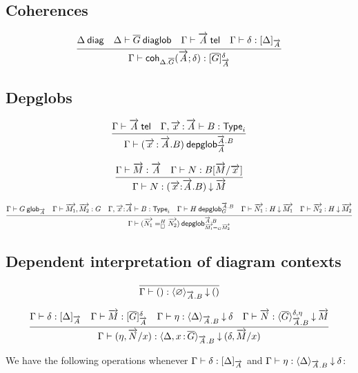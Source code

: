 \subsection{Coherences}

\begin{small}
  \[
  \infer{\ofglob{\Gamma}{\coh{{\Delta}.\diag{G}}{\tel A}{\delta}}
    {\interpglob{\diag{G}}{\tel A}{\delta}}}
  {\wfdiag{\Delta}
    & \wfdiaglob{\Delta}{\diag G}
    & \wftel{\Gamma}{\tel A}
    & \ofinterp{\Gamma}{\delta}{\Delta}{\tel A}}
  \]
\end{small}

\subsection{Depglobs}

\begin{small}
\[
\infer
  {\wfdepglob{\Gamma}{(\teltm xA.B)}{\tel{A}.B}{\tel{A}}}
  {\wftel{\Gamma}{\tel A}
  &\wftype{\Gamma,\teltm xA}{B}}
\]

\[
\infer
  {\ofdepglob{\Gamma}{N}{(\tel{x}{:}\tel{A}.B)}{\tel{M}}}
  {\ofglob{\Gamma}{\tel{M}}{\tel{A}}
  &\ofglob{\Gamma}{N}{B[\tel{M}/\tel{x}]}}
\]

  \[\infer{\wfdepglob{\Gamma}{(\dhomj{H}{\tel{N_1}}{\tel{N_2}}{\blank})}
    {\tel{A}.B}{\homj{G}{\tel{M_1}}{\tel{M_2}}}}
  {\wfglob{\Gamma}{G}{\tel{A}}
    & \ofglob{\Gamma}{\tel{M_1},\tel{M_2}}{G}
    & \wftype{\Gamma,\tel{x}{:}\tel{A}}{B}
    & \wfdepglob{\Gamma}{H}{\tel{A}.B}{G}
    & \ofdepglob{\Gamma}{\tel{N_1}}{H}{\tel{M_1}}
    & \ofdepglob{\Gamma}{\tel{N_2}}{H}{\tel{M_2}}}\]
\end{small}

\subsection{Dependent interpretation of diagram contexts}

\[\infer
  {\ofinterpdep{\Gamma}{()}{\emptyctx}{\tel A.B}{()}}
  {}
\]

\[
\infer
  {\ofinterpdep{\Gamma}{(\eta,\tel N/x)}
   {\Delta,\tptm{x}{\diag G}}{\tel A.B}{(\delta,\tel M/x)}}
  {\ofinterp{\Gamma}{\delta}{\Delta}{\tel A}
  &\ofglob{\Gamma}{\tel M}{\interpglob{\diag G}{\tel A}{\delta}}
  &\ofinterpdep{\Gamma}{\eta}{\Delta}{\tel A.B}{\delta}
  &\ofdepglob{\Gamma}{\tel N}{\interpdepglob{\diag G}{\tel A.B}{\delta}{\eta}}
   {\tel M}}
\]

We have the following operations whenever
${\Gamma} \vdash {\delta} : {[ \Delta ]_{\overrightarrow{A}}}$ and
${\Gamma} \vdash {\eta} : {\langle \Delta \rangle_{\overrightarrow{A}.B}}\mathbin{\downarrow}{\delta}$:

